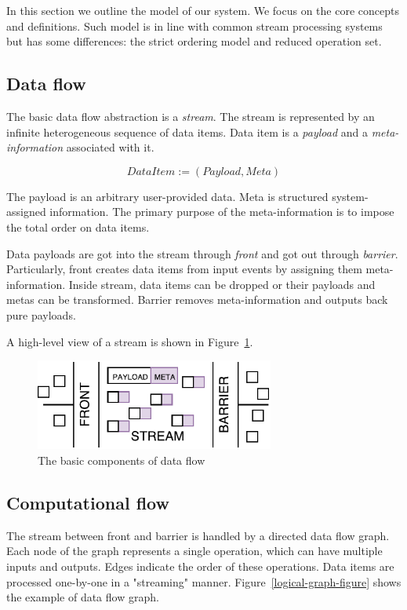 
\label {fs-model}
In this section we outline the model of our system. We focus on the core concepts and definitions. Such model is in line with common stream processing systems but has some differences: the strict ordering model and reduced operation set.

\subsection{Data flow}

The basic data flow abstraction is a {\it stream}. The stream is represented by an infinite heterogeneous sequence of data items. Data item is a {\it payload} and a {\it meta-information} associated with it. 

\[DataItem := (Payload, Meta)\]

The payload is an arbitrary user-provided data. Meta is structured system-assigned information. The primary purpose of the meta-information is to impose the total order on data items. 

Data payloads are got into the stream through {\it front} and got out through {\it barrier}. Particularly, front creates data items from input events by assigning them meta-information. Inside stream, data items can be dropped or their payloads and metas can be transformed. Barrier removes meta-information and outputs back pure payloads. 

A high-level view of a stream is shown in Figure~\ref{stream}.

\begin{figure}[htbp]
  \centering
  \includegraphics[width=0.70\textwidth]{pics/stream}
  \caption{The basic components of data flow}
  \label {stream}
\end{figure}

\subsection{Computational flow}

The stream between front and barrier is handled by a directed data flow graph. Each node of the graph represents a single operation, which can have multiple inputs and outputs. Edges indicate the order of these operations. Data items are processed one-by-one in a "streaming" manner. Figure~\ref{logical-graph-figure} shows the example of data flow graph.

